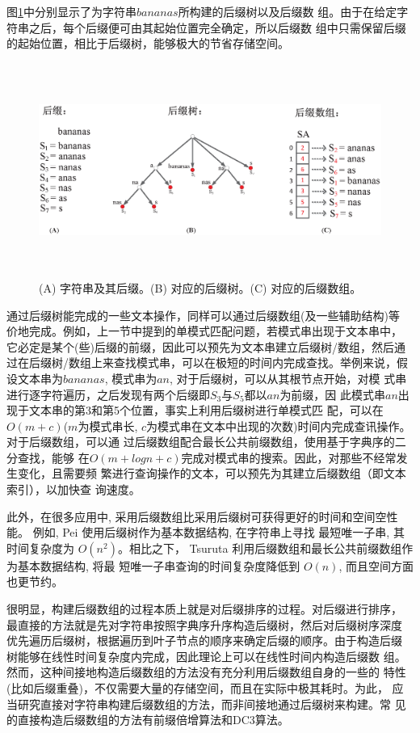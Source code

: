 图\ref{fig:suffix}中分别显示了为字符串$bananas$所构建的后缀树以及后缀数
组。由于在给定字符串之后，每个后缀便可由其起始位置完全确定，所以后缀数
组中只需保留后缀的起始位置，相比于后缀树，能够极大的节省存储空间。


\begin{figure}[H]
  \centering
  \includegraphics[height=7cm ,width=15cm]{figures/1_Introduction/Suffix.eps}
  \caption{(A) 字符串及其后缀。(B) 对应的后缀树。(C) 对应的后缀数组。}
  \label{fig:suffix}
\end{figure}

通过后缀树能完成的一些文本操作，同样可以通过后缀数组(及一些辅助结构)等
价地完成。例如，上一节中提到的单模式匹配问题，若模式串出现于文本串中，
它必定是某个(些)后缀的前缀，因此可以预先为文本串建立后缀树/数组，然后通
过在后缀树/数组上来查找模式串，可以在极短的时间内完成查找。举例来说，假
设文本串为$bananas$, 模式串为$an$, 对于后缀树，可以从其根节点开始，对模
式串进行逐字符遍历，之后发现有两个后缀即$S_3$与$S_5$都以$an$为前缀，因
此模式串$an$出现于文本串的第3和第5个位置，事实上利用后缀树进行单模式匹
配，可以在$O(m+c)$($m$为模式串长,
$c$为模式串在文本中出现的次数)时间内完成查讯操作。对于后缀数组，可以通
过后缀数组配合最长公共前缀数组，使用基于字典序的二分查找，能够
在$O(m+logn+c)$完成对模式串的搜索。因此，对那些不经常发生变化，且需要频
繁进行查询操作的文本，可以预先为其建立后缀数组（即文本索引），以加快查
询速度。

此外，在很多应用中, 采用后缀数组比采用后缀树可获得更好的时间和空间空性
能。 例如, Pei\cite{Pei2013} 使用后缀树作为基本数据结构, 在字符串上寻找
最短唯一子串, 其时间复杂度为 $O(n^2)$。相比之下， Tsuruta
\cite{Tsuruta2014} 利用后缀数组和最长公共前缀数组作为基本数据结构, 将最
短唯一子串查询的时间复杂度降低到 $O(n)$, 而且空间方面也更节约。

很明显，构建后缀数组的过程本质上就是对后缀排序的过程。对后缀进行排序，
最直接的方法就是先对字符串按照字典序升序构造后缀树，然后对后缀树序深度
优先遍历后缀树，根据遍历到叶子节点的顺序来确定后缀的顺序。由于构造后缀
树能够在线性时间复杂度内完成，因此理论上可以在线性时间内构造后缀数
组。 然而，这种间接地构造后缀数组的方法没有充分利用后缀数组自身的一些的
特性(比如后缀重叠)，不仅需要大量的存储空间，而且在实际中极其耗时。为此，
应当研究直接对字符串构建后缀数组的方法，而非间接地通过后缀树来构建。常
见的直接构造后缀数组的方法有前缀倍增算法和DC3算法。

